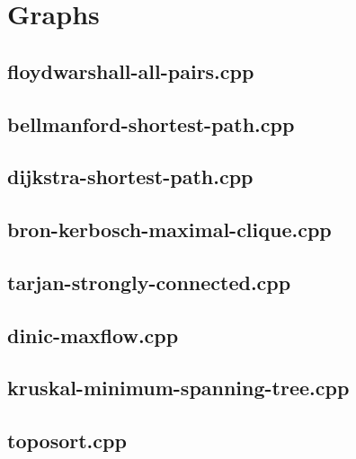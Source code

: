 \documentclass[10pt,twocolumn,landscape]{article}
\begin{document}
\section{Graphs}

\subsection{floydwarshall-all-pairs.cpp}


\subsection{bellmanford-shortest-path.cpp}


\subsection{dijkstra-shortest-path.cpp}


\subsection{bron-kerbosch-maximal-clique.cpp}


\subsection{tarjan-strongly-connected.cpp}


\subsection{dinic-maxflow.cpp}


\subsection{kruskal-minimum-spanning-tree.cpp}


\subsection{toposort.cpp}

\end{document}
